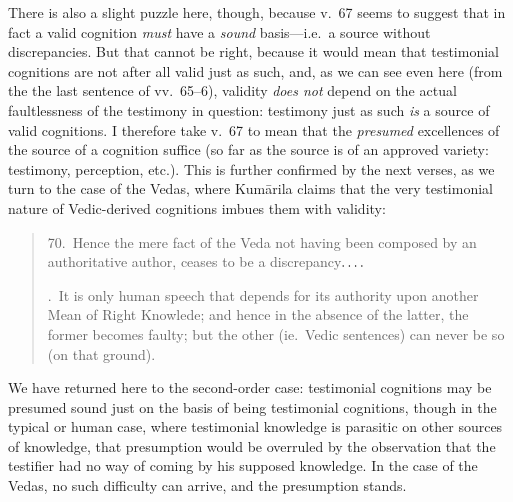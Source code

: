\documentclass[11pt,letterpaper,oneside]{amsart}
\newcommand{\sdots}{$\ldotp\ldotp\ldotp\ldotp$\ }
\newenvironment{squote}{\begin{quote}\sf\small}{\rm\end{quote}} %
\begin{document}
There is also a slight puzzle here, though, because v.\ 67 seems to suggest that in fact a valid cognition \emph{must} have a \emph{sound} basis---i.e.\ a source without discrepancies. But that cannot be right, because it would mean that testimonial cognitions are not after all valid just as such, and, as we can see even here (from the the last sentence of vv.\ 65--6), validity \emph{does not} depend on the actual faultlessness of the testimony in question: testimony just as such \emph{is} a source of valid cognitions. I therefore take v.\ 67 to mean that the \emph{presumed} excellences of the source of a cognition suffice (so far as the source is of an approved variety: testimony, perception, etc.). This is further confirmed by the next verses, as we turn to the case of the Vedas, where Kum\=arila claims that the very testimonial nature of Vedic-derived cognitions imbues them with validity:\begin{squote}70.\ Hence the mere fact of the Veda not having been composed by an authoritative author, ceases to be a discrepancy\sdots 

.\ It is only human speech that depends for its authority upon another Mean of Right Knowlede; and hence in the absence of the latter, the former becomes faulty; but the other (ie.\ Vedic sentences) can never be so (on that ground).\end{squote} We have returned here to the second-order case: testimonial cognitions may be presumed sound just on the basis of being testimonial cognitions, though in the typical or human case, where testimonial knowledge is parasitic on other sources of knowledge, that presumption would be overruled by the observation that the testifier had no way of coming by his supposed knowledge. In the case of the Vedas, no such difficulty can arrive, and the presumption stands.
\end{document}
